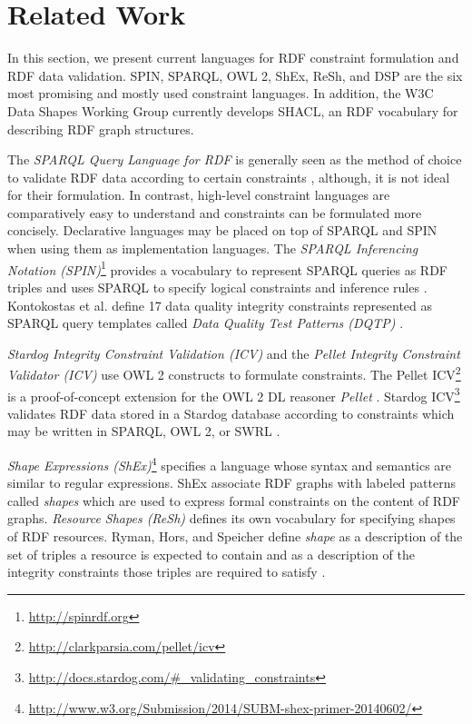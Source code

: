 \documentclass[a4paper,fontsize=11pt]{scrartcl}
\begin{document}
\section{Related Work}

In this section, we present current languages for RDF constraint formulation and RDF data validation. SPIN, SPARQL, OWL 2, ShEx, ReSh, and DSP are the six most promising and mostly used constraint languages. In addition, the W3C Data Shapes Working Group currently develops SHACL, an RDF vocabulary for describing RDF graph structures.

The \emph{SPARQL Query Language for RDF} \cite{W3C-SPARQL1.1-Query-Language-2013} is generally seen as the method of choice to validate RDF data according to certain constraints \cite{Fuerber2010}, 
although, it is not ideal for their formulation. 
In contrast, high-level constraint languages are comparatively easy to understand and constraints can be formulated more concisely.
Declarative languages may be placed on top of SPARQL and SPIN when using them as implementation languages. The \emph{SPARQL Inferencing Notation (SPIN)}\footnote{\url{http://spinrdf.org}} \cite{W3C-SPIN-2011} provides a vocabulary to represent SPARQL queries as RDF triples
and uses SPARQL to specify logical constraints and inference rules \cite{Fuerber2010}. Kontokostas et al. define 17 data quality integrity constraints represented as SPARQL query templates called \emph{Data Quality Test Patterns (DQTP)} \cite{Kontokostas2014}. 

\emph{Stardog Integrity Constraint Validation (ICV)} and the \emph{Pellet Integrity Constraint Validator (ICV)} use OWL 2 constructs to formulate constraints. The Pellet ICV\footnote{\url{http://clarkparsia.com/pellet/icv}} is a proof-of-concept extension for the OWL 2 DL reasoner \emph{Pellet} \cite{sirin2007pellet}. Stardog ICV\footnote{\url{http://docs.stardog.com/#_validating_constraints}} validates RDF data stored in a Stardog database according to constraints which may be written in SPARQL, OWL 2, or SWRL \cite{Horrocks04}. 

\emph{Shape Expressions (ShEx)}\footnote{\url{http://www.w3.org/Submission/2014/SUBM-shex-primer-20140602/}} \cite{W3C-ShEx-Primer-2014,W3C-ShEx-Definition-2014,Prud'hommeaux-2014,Boneva-2014} specifies a language whose syntax and semantics are similar to regular expressions. ShEx associate RDF graphs with labeled patterns called \emph{shapes} which are used to express formal constraints on the content of RDF graphs. \emph{Resource Shapes (ReSh)} \cite{W3C-ReSh-2014} defines its own vocabulary for specifying shapes of RDF resources. Ryman, Hors, and Speicher define \emph{shape} as a description of the set of triples a resource is expected to contain and as a description of the integrity constraints those triples are required to satisfy \cite{Ryman2013}. 
\end{document}
